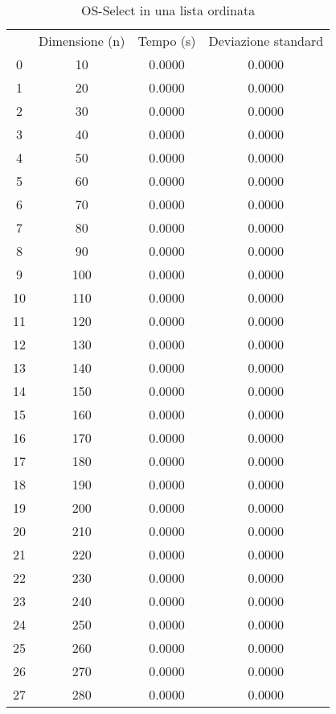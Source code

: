 \begin{table}
\centering
\caption{OS-Select in una lista ordinata}
\label{OS-Select in una lista ordinata}
\begin{adjustbox}{width=1\textwidth/2}
\begin{tabular}{|c|c|c|c|}
\hline
 & Dimensione (n) & Tempo (s) & Deviazione standard \\
0 & 10 & 0.0000 & 0.0000 \\
\cline{1-4}
1 & 20 & 0.0000 & 0.0000 \\
\cline{1-4}
2 & 30 & 0.0000 & 0.0000 \\
\cline{1-4}
3 & 40 & 0.0000 & 0.0000 \\
\cline{1-4}
4 & 50 & 0.0000 & 0.0000 \\
\cline{1-4}
5 & 60 & 0.0000 & 0.0000 \\
\cline{1-4}
6 & 70 & 0.0000 & 0.0000 \\
\cline{1-4}
7 & 80 & 0.0000 & 0.0000 \\
\cline{1-4}
8 & 90 & 0.0000 & 0.0000 \\
\cline{1-4}
9 & 100 & 0.0000 & 0.0000 \\
\cline{1-4}
10 & 110 & 0.0000 & 0.0000 \\
\cline{1-4}
11 & 120 & 0.0000 & 0.0000 \\
\cline{1-4}
12 & 130 & 0.0000 & 0.0000 \\
\cline{1-4}
13 & 140 & 0.0000 & 0.0000 \\
\cline{1-4}
14 & 150 & 0.0000 & 0.0000 \\
\cline{1-4}
15 & 160 & 0.0000 & 0.0000 \\
\cline{1-4}
16 & 170 & 0.0000 & 0.0000 \\
\cline{1-4}
17 & 180 & 0.0000 & 0.0000 \\
\cline{1-4}
18 & 190 & 0.0000 & 0.0000 \\
\cline{1-4}
19 & 200 & 0.0000 & 0.0000 \\
\cline{1-4}
20 & 210 & 0.0000 & 0.0000 \\
\cline{1-4}
21 & 220 & 0.0000 & 0.0000 \\
\cline{1-4}
22 & 230 & 0.0000 & 0.0000 \\
\cline{1-4}
23 & 240 & 0.0000 & 0.0000 \\
\cline{1-4}
24 & 250 & 0.0000 & 0.0000 \\
\cline{1-4}
25 & 260 & 0.0000 & 0.0000 \\
\cline{1-4}
26 & 270 & 0.0000 & 0.0000 \\
\cline{1-4}
27 & 280 & 0.0000 & 0.0000 \\

\end{tabular}
\end{adjustbox}
\end{table}
